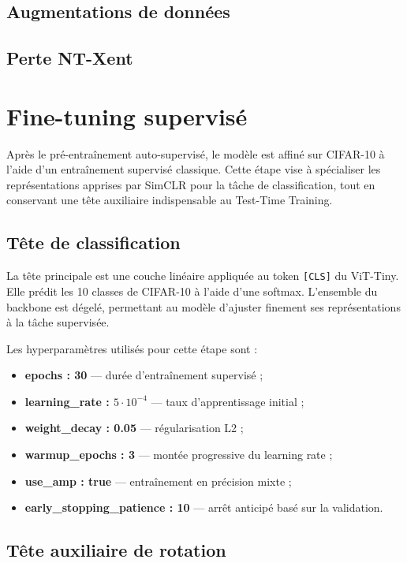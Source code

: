 \documentclass[12pt,a4paper]{report}
\begin{document}
	\subsection{Augmentations de données}
	
	\subsection{Perte NT-Xent}
	
	\section{Fine-tuning supervisé}
	
	Après le pré-entraînement auto-supervisé, le modèle est affiné sur CIFAR-10 à l’aide d’un entraînement supervisé classique. 
	Cette étape vise à spécialiser les représentations apprises par SimCLR pour la tâche de classification, tout en conservant une tête auxiliaire indispensable au Test-Time Training.
	
	\subsection{Tête de classification}
	
	La tête principale est une couche linéaire appliquée au token \texttt{[CLS]} du ViT-Tiny.  
	Elle prédit les 10 classes de CIFAR-10 à l’aide d’une softmax.  
	L’ensemble du backbone est dégelé, permettant au modèle d’ajuster finement ses représentations à la tâche supervisée.
	
	Les hyperparamètres utilisés pour cette étape sont :
	\begin{itemize}
		\item \textbf{epochs : 30} — durée d’entraînement supervisé ;
		\item \textbf{learning\_rate : $5\cdot10^{-4}$} — taux d’apprentissage initial ;
		\item \textbf{weight\_decay : 0.05} — régularisation L2 ;
		\item \textbf{warmup\_epochs : 3} — montée progressive du learning rate ;
		\item \textbf{use\_amp : true} — entraînement en précision mixte ;
		\item \textbf{early\_stopping\_patience : 10} — arrêt anticipé basé sur la validation.
	\end{itemize}
	
	\subsection{Tête auxiliaire de rotation}
	
\end{document}
